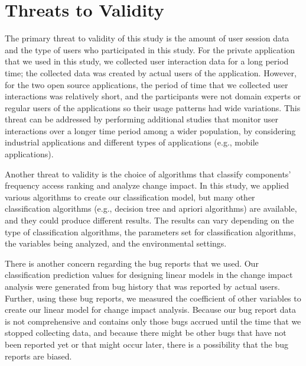 \section{Threats to Validity}
\label{sec:validity}

The primary threat to validity of this study is the amount of
user session data and the type of users who participated in this
study. For the private application that we used in this study,
we collected user interaction data for a long period time; 
the collected data was created by actual users of 
the application. However, for the two open source applications, 
the period of time that we collected user interactions was relatively 
short, and the participants were not domain experts or regular users 
of the applications so their usage patterns had wide variations.
This threat can be addressed by performing additional studies that
monitor user interactions over a longer time period among a wider population,
by considering industrial applications and different types of 
applications (e.g., mobile applications).
 
Another threat to validity is the choice of algorithms that classify 
components' frequency access ranking and analyze change impact. 
In this study, we applied various algorithms to create our classification
model, but many other classification algorithms (e.g., decision tree and
apriori algorithms) are available, and they could produce different results.
The results can vary depending on the type of classification algorithms, 
the parameters set for classification algorithms, the variables being analyzed, 
and the environmental settings. 

There is another concern regarding the bug reports that we used.
Our classification prediction values for designing linear models 
in the change impact analysis were generated from bug history that 
was reported by actual users.
Further, using these bug reports, we measured the coefficient of other 
variables to create our linear model for change impact analysis.
Because our bug report data is not comprehensive and contains 
only those bugs accrued 
until the time that we stopped collecting data, 
and because there might 
be other bugs that have not been reported yet or that might occur 
later, there is a possibility that the bug reports are biased.


